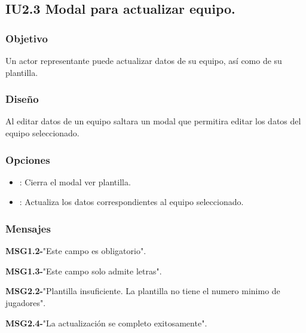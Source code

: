 
\subsection{IU2.3 Modal para actualizar equipo.}

\subsubsection{Objetivo}
	Un actor representante puede actualizar datos de su equipo, así como de su plantilla.

\subsubsection{Diseño}
  Al editar datos de un equipo saltara un modal que permitira editar los datos del equipo seleccionado.
  
\subsubsection{Opciones}
\begin{itemize}
	\item {}: Cierra el modal ver plantilla.
	\item {}: Actualiza los datos correspondientes al equipo seleccionado.
\end{itemize}

\subsubsection{Mensajes}
	\begin{Citemize}
		\item {\bf MSG1.2-}"Este campo es obligatorio".
			\item {\bf MSG1.3-}"Este campo solo admite letras".
			\item {\bf MSG2.2-}"Plantilla insuficiente. La plantilla no tiene el numero minimo de jugadores".
			\item {\bf MSG2.4-}"La actualización se completo exitosamente".
	\end{Citemize}